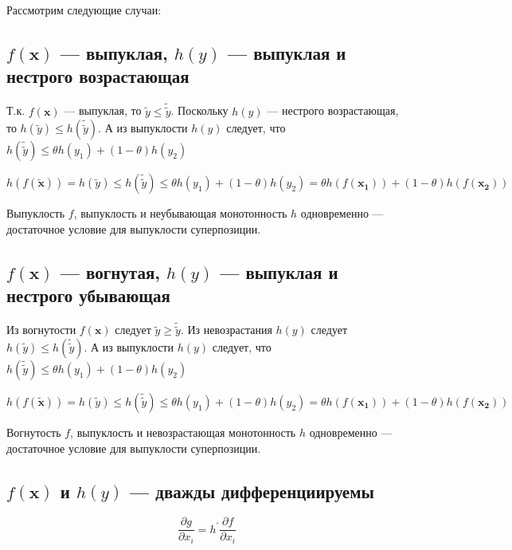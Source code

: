 	Рассмотрим следующие случаи:
	
	\subsection{$f(\mathbf{x})$ --- выпуклая, $h(y)$ --- выпуклая и нестрого
		возрастающая}
	
	Т.к. $f(\mathbf{x})$ --- выпуклая, то $\tilde{y} \leqslant \tilde{\tilde{y}}$.
	Поскольку $h(y)$ --- нестрого возрастающая, то $ h(\tilde{y}) \leqslant
	h({\tilde{\tilde{y}}})$. А из выпуклости $h(y)$ следует, что
	$h(\tilde{\tilde{y}}) \leqslant \theta h(y_1) + (1 - \theta) h(y_2)$
	
	\begin{equation}
	h(f(\mathbf{\tilde{x}})) =h( \tilde{y}) \leqslant h(\tilde{\tilde{y}})
	\leqslant \theta h(y_1) + (1 - \theta) h(y_2) = \theta h(f(\mathbf{x_1})) + (1 -
	\theta) h(f(\mathbf{x_2}))
	\end{equation}
	
	Выпуклость $f$, выпуклость и неубывающая монотонность $h$ одновременно ---
	достаточное условие для выпуклости суперпозиции.
	
	\subsection{$f(\mathbf{x})$ --- вогнутая, $h(y)$ --- выпуклая и нестрого
		убывающая}
	
	Из вогнутости $f(\mathbf{x})$ следует $\tilde{y} \geqslant \tilde{\tilde{y}}$.
	Из невозрастания $h(y)$ следует $ h(\tilde{y}) \leqslant
	h({\tilde{\tilde{y}}})$. А из выпуклости $h(y)$ следует, что
	$h(\tilde{\tilde{y}}) \leqslant \theta h(y_1) + (1 - \theta) h(y_2)$
	
	\begin{equation}
	h(f(\mathbf{\tilde{x}})) =h( \tilde{y}) \leqslant h(\tilde{\tilde{y}})
	\leqslant \theta h(y_1) + (1 - \theta) h(y_2) = \theta h(f(\mathbf{x_1})) + (1 -
	\theta) h(f(\mathbf{x_2}))
	\end{equation}
	
	Вогнутость $f$, выпуклость и невозрастающая монотонность $h$ одновременно ---
	достаточное условие для выпуклости суперпозиции.
	
	\subsection{$f(\mathbf{x})$ и $h(y)$ --- дважды дифференциируемы}
	
	\begin{equation}
	\frac{\partial g}{\partial x_i} = h^{\prime} \frac{\partial f}{\partial x_i}
	\end{equation}
	
